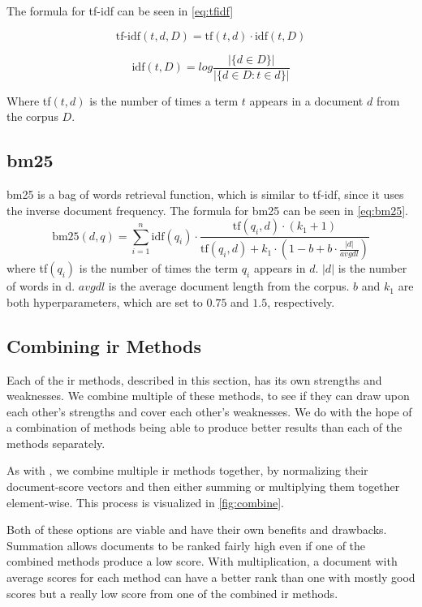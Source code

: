 The formula for \gls{tf-idf} can be seen in \autoref{eq:tfidf}

\begin{equation}\label{eq:tfidf}
	\text{tf-idf}(t, d, D) = \text{tf}(t, d) \cdot \text{idf}(t, D)
\end{equation}

\begin{equation}\label{eq:idf}
	\text{idf}(t,D) = log \frac{|\{d \in D\}|}{|\{d \in D : t \in d\}|}
\end{equation}
	
Where tf$(t, d)$ is the number of times a term $t$ appears in a document $d$ from the corpus $D$.

\subsection{\acrlong{bm25}}
\gls{bm25} is a bag of words retrieval function, which is similar to \gls{tf-idf}, since it uses the inverse document frequency.
The formula for \gls{bm25} can be seen in \autoref{eq:bm25}\cite{bm25}.
\begin{equation}\label{eq:bm25}
	\text{bm25}(d, q) = \sum_{i=1}^{n}\text{idf}(q_i) \cdot \frac{\text{tf}(q_i, d) \cdot (k_1 + 1)}{\text{tf}(q_i, d) + k_1 \cdot (1 - b + b \cdot \frac{|d|}{avgdl})}
\end{equation}
where tf$(q_i)$ is the number of times the term $q_i$ appears in $d$.
$|d|$ is the number of words in d. 
$avgdl$ is the average document length from the corpus.
$b$ and $k_1$ are both hyperparameters, which are set to $0.75$ and $1.5$, respectively.

\subsection{Combining \gls{ir} Methods}
Each of the \gls{ir} methods, described in this section, has its own strengths and weaknesses.
We combine multiple of these methods, to see if they can draw upon each other's strengths and cover each other's weaknesses.
We do with the hope of a combination of methods being able to produce better results than each of the methods separately.

As with \citet{yang2009topic}, we combine multiple \gls{ir} methods together, by normalizing their document-score vectors and then either summing or multiplying them together element-wise.
This process is visualized in \ref{fig:combine}.



Both of these options are viable and have their own benefits and drawbacks.
Summation allows documents to be ranked fairly high even if one of the combined methods produce a low score.
With multiplication, a document with average scores for each method can have a better rank than one with mostly good scores but a really low score from one of the combined \gls{ir} methods.
